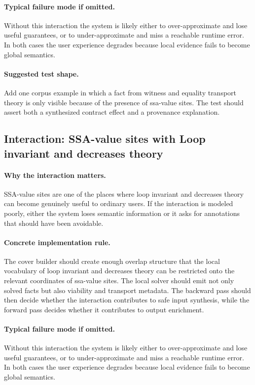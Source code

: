 \documentclass[11pt]{report}
\theoremstyle{definition}
\theoremstyle{plain}
\begin{document}
\paragraph{Typical failure mode if omitted.}
Without this interaction the system is likely either to over-approximate and
lose useful guarantees, or to under-approximate and miss a reachable runtime
error. In both cases the user experience degrades because local evidence
fails to become global semantics.

\paragraph{Suggested test shape.}
Add one corpus example in which a fact from witness and equality transport theory is only
visible because of the presence of ssa-value sites. The test should
assert both a synthesized contract effect and a provenance explanation.

\subsection{Interaction: SSA-value sites with Loop invariant and decreases theory}

\paragraph{Why the interaction matters.}
SSA-value sites are one of the places where loop invariant and decreases theory can become
genuinely useful to ordinary users. If the interaction is modeled poorly,
either the system loses semantic information or it asks for annotations that
should have been avoidable.

\paragraph{Concrete implementation rule.}
The cover builder should create enough overlap structure that the local
vocabulary of loop invariant and decreases theory can be restricted onto the relevant
coordinates of ssa-value sites. The local solver should emit not only
solved facts but also viability and transport metadata. The backward pass
should then decide whether the interaction contributes to safe input
synthesis, while the forward pass decides whether it contributes to output
enrichment.

\paragraph{Typical failure mode if omitted.}
Without this interaction the system is likely either to over-approximate and
lose useful guarantees, or to under-approximate and miss a reachable runtime
error. In both cases the user experience degrades because local evidence
fails to become global semantics.
\end{document}
